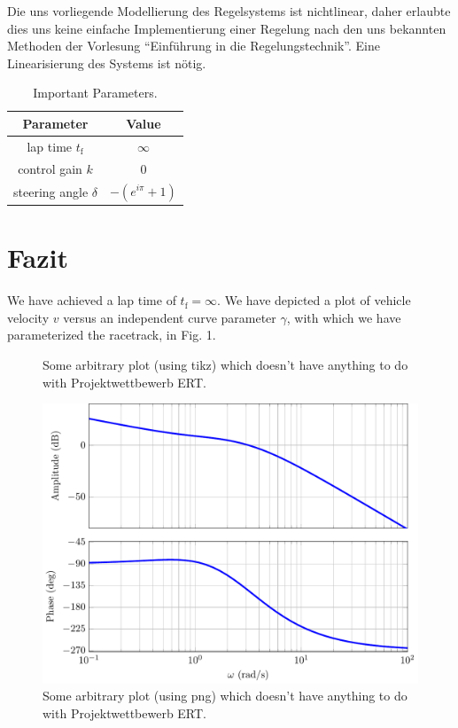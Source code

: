 \documentclass[pdf]{ifacconf}
\begin{document}
Die uns vorliegende Modellierung des Regelsystems ist nichtlinear, daher erlaubte dies uns keine einfache Implementierung einer Regelung nach den uns bekannten Methoden der Vorlesung ``Einführung in die Regelungstechnik''. Eine Linearisierung des Systems ist nötig.





\begin{table}[h]
\caption{Important Parameters.}
\label{table:working plan}
\centering
\begin{tabular}{|c|c|}
\hline
\bfseries Parameter & \bfseries Value \\ \hline \hline
lap time $t_{\text{f}}$ & $\infty$ \\ \hline
control gain $k$ & $0$ \\ \hline
steering angle $\delta$ & $-\left( e^{i \pi}+1\right)$ \\ \hline
 \end{tabular}
\end{table}

\section{Fazit}
We have achieved a lap time of $t_{\text{f}}=\infty$. We have depicted a plot of vehicle velocity $v$ versus an independent curve parameter $\gamma$, with which we have parameterized the racetrack, in Fig. 1. 

\begin{figure}[h] %
\begin{center}

\caption{Some arbitrary plot (using tikz) which doesn't have anything to do with Projektwettbewerb ERT.}
\label{fig1}
\end{center}
\end{figure}

\begin{figure}[h] %
\begin{center}
\includegraphics[width=.8\columnwidth]{bode} %
\caption{Some arbitrary plot (using png) which doesn't have anything to do with Projektwettbewerb ERT.}
\label{fig1}
\end{center}
\end{figure}





%
%

\end{document}
